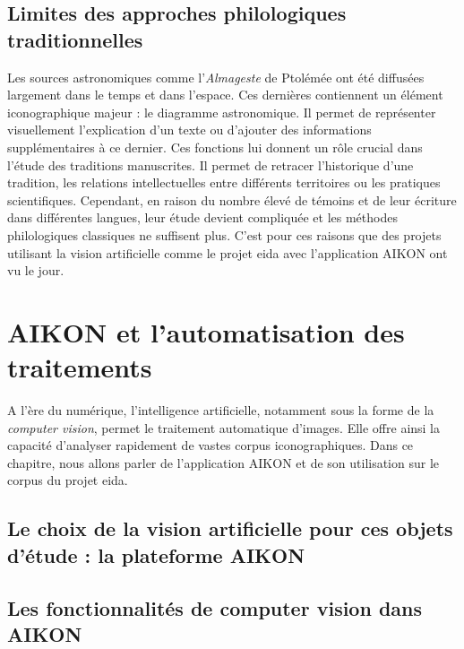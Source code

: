 \documentclass[a4paper,12pt,twoside]{book}
\newcommand{\clearemptydoublepage}{\newpage{\pagestyle{empty}\cleardoublepage}}
\newcommand{\almageste}{\textit{Almageste}\xspace}
\begin{document}
	


	
	\section{Limites des approches philologiques traditionnelles}
	
	
	
	Les sources astronomiques comme l'\almageste de Ptolémée ont été diffusées largement dans le temps et dans l'espace. Ces dernières contiennent un élément iconographique majeur : le diagramme astronomique. Il permet de représenter visuellement l'explication d'un texte ou d'ajouter des informations supplémentaires à ce dernier. Ces fonctions lui donnent un rôle crucial dans l'étude des traditions manuscrites. Il permet de retracer l'historique d'une tradition, les relations intellectuelles entre différents territoires ou les pratiques scientifiques. Cependant, en raison du nombre élevé de témoins et de leur écriture dans différentes langues, leur étude devient compliquée et les méthodes philologiques classiques ne suffisent plus. C'est pour ces raisons que des projets utilisant la vision artificielle comme le projet \gls{eida} avec l'application AIKON ont vu le jour.
	
	
	\clearemptydoublepage
	
	\chapter{AIKON et l'automatisation des traitements}
	
	A l'ère du numérique, l'intelligence artificielle, notamment sous la forme de la \textit{computer vision}, permet le traitement automatique d'images. Elle offre ainsi la capacité d'analyser rapidement de vastes corpus iconographiques. Dans ce chapitre, nous allons parler de l'application AIKON et de son utilisation sur le corpus du projet \gls{eida}.
	
	\section[La plateforme AIKON]{Le choix de la vision artificielle pour ces objets d'étude : la plateforme AIKON}
	
	 
	
	\section{Les fonctionnalités de computer vision dans AIKON}
	
	
\end{document}
